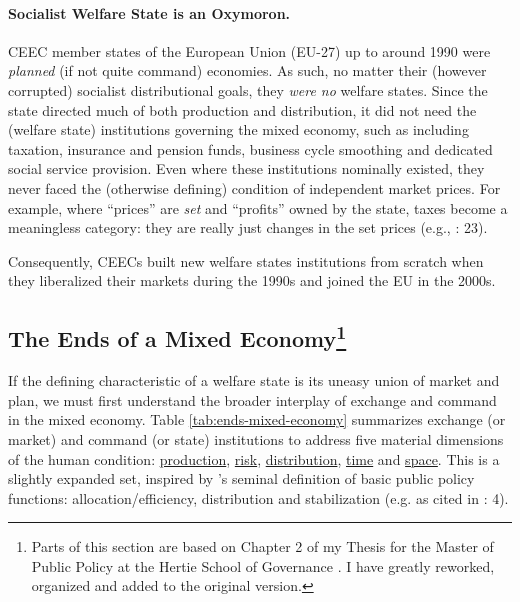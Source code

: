 \paragraph{Socialist Welfare State is an Oxymoron.} \gls{CEEC} member states of the European Union (EU-27) up to around 1990 were \emph{planned} (if not quite command) economies. As such, no matter their (however corrupted) socialist distributional goals, they \emph{were no} welfare states. Since the state directed much of both production and distribution, it did not need the (welfare state) institutions governing the mixed economy, such as including taxation, insurance and pension funds, business cycle smoothing and dedicated social service provision. Even where these institutions nominally existed, they never faced the (otherwise defining) condition of independent market prices. For example, where ``prices'' are \emph{set} and ``profits'' owned by the state, taxes become a meaningless category: they are really just changes in the set prices (e.g., \citealt{Bonker2006}: 23).

Consequently, \glspl{CEEC} built new welfare states institutions from scratch when they liberalized their markets during the 1990s and joined the EU in the 2000s. %

\subsection[Ends]{The Ends of a Mixed Economy\footnote{
	Parts of this section are based on Chapter 2 of my Thesis for the Master of Public Policy at the Hertie School of Governance \citep{Held2010a}. I have greatly reworked, organized and added to the original version.}} \label{sec:ends}
If the defining characteristic of a welfare state is its uneasy union of market and plan, we must first understand the broader interplay of exchange and command in the mixed economy. Table \ref{tab:ends-mixed-economy} summarizes exchange (or market) and command (or state) institutions to address five material dimensions of the human condition: \hyperref[sec:production]{production}, \hyperref[sec:risk]{risk}, \hyperref[sec:distribution]{distribution}, \hyperref[sec:time]{time} and \hyperref[sec:space]{space}. This is a slightly expanded set, inspired by \citeauthor{MusgThet1959}'s \citeyearpar{MusgThet1959} seminal definition of basic public policy functions: allocation/efficiency, distribution and stabilization (e.g. as cited in \citealt{Bordo2011}: 4).


